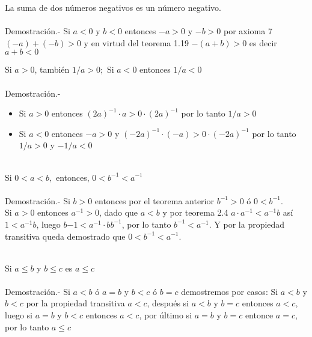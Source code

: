 \begin{teo}
La suma de dos números negativos es un número negativo.\\\\
Demostración.- \;   Si $a<0$ y $b<0$ entonces $-a>0$ y $-b>0$ por axioma 7 \; $(-a)+(-b)>0$ y en virtud del teorema 1.19 \; $-(a+b)>0$ es decir $a+b<0$\\
\end{teo}   

\begin{teo}
Si $a>0$, también $1/a>0;$ Si $a<0$ entonces $1/a<0$\\\\
Demostración.- \;
\begin{itemize}
\item Si $a>0$ entonces $(2a)^{-1}\cdot a > 0 \cdot (2a)^{-1}$ por lo tanto $1/a>0$
\item Si $a<0$ entonces $-a>0$ y $(-2a)^{-1}\cdot (-a)>0\cdot (-2a)^{-1}$ por lo tanto $1/a>0$ y $-1/a<0$\\\\
\end{itemize}  
\end{teo}

\begin{teo}
Si $0<a<b,$ entonces, $0<b^{-1}<a^{-1}$\\\\
Demostración.- \; Si $b>0$ entonces por el teorema anterior  $b^{-1}>0$ ó $0<b^{-1}$.\\
Si $a>0$ entonces $a^{-1}>0$, dado que $a<b$ y por teorema 2.4 \; $a\cdot a^{-1}< a^{-1}b$ así $1<a^{-1}b$, luego $b{-1}<a^{-1}\cdot bb^{-1}$, por lo tanto $b^{-1}<a^{-1}$. Y por la propiedad transitiva queda demostrado que $0<b^{-1}<a^{-1}$.\\\\
\end{teo}   

\begin{teo}
Si $a \leq b $ y $b \leq c$ es $a\leq c$\\\\
Demostración.- \; Si $a<b$ ó $a=b$ y $b<c$ ó $b=c$ demostremos por casos: Si $a<b$ y $b<c$ por la propiedad transitiva $a<c$, después si $a<b$ y $b=c$ entonces $a<c$, luego si $a=b$ y $b<c$ entonces $a<c$,  por último si $a=b$ y $b=c$ entonce $a=c$, por lo tanto $a\leq c$\\\\
\end{teo}

